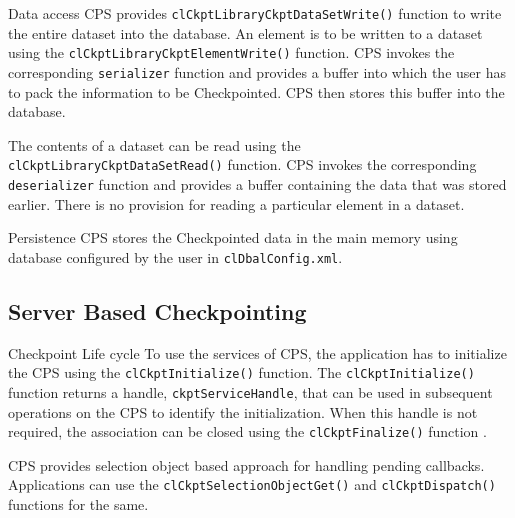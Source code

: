 \begin{flushleft}
\begin{Desc}
\item
[Data access]
CPS provides {\tt{clCkptLibraryCkptDataSetWrite()}} function to write the entire dataset into the database. An element is to be written to a dataset using the 
{\tt{clCkptLibraryCkptElementWrite()}} function. CPS invokes the corresponding {\tt{serializer}} function and provides a buffer into which the user has to 
pack the information to be Checkpointed. CPS then stores this buffer into the database.
\par
The contents of a dataset can be read using the {\tt{clCkptLibraryCkptDataSetRead()}} function. CPS invokes the corresponding {\tt{deserializer}} function and 
provides a buffer containing the data that was stored earlier. There is no provision for reading a particular element in a dataset.
\end{Desc}

\begin{Desc}
\item
[Persistence]
CPS stores the Checkpointed data in the main memory using database configured by the user in {\tt{clDbalConfig.xml}}. 
\end{Desc}

\subsection{Server Based Checkpointing}
\begin{Desc}
\item
[Checkpoint Life cycle]
To use the services of CPS, the application has to initialize the CPS using the {\tt{clCkptInitialize()}} function. The {\tt{clCkptInitialize()}} function returns a handle, 
{\tt{ckptServiceHandle}}, that can be used in subsequent operations on the CPS to identify the initialization. When this handle is not required, the 
association can be closed using the {\tt{clCkptFinalize()}} function .
\par
CPS provides selection object based approach for handling pending callbacks. Applications can use the {\tt{clCkptSelectionObjectGet()}} and 
{\tt{clCkptDispatch()}} functions for the same.
\end{Desc}


\end{flushleft}
